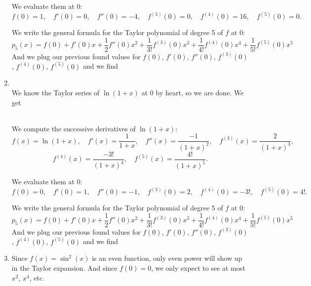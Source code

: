 \documentclass[pdftex,11pt]{article}
\begin{document}
\begin{enumerate}
We evaluate them at $0$:
$$ 
f(0) = 1,
\quad
f'(0) = 0,
\quad
f''(0) = -4,
\quad
f^{(3)}(0) = 0,
\quad
f^{(4)}(0) = 16,
\quad
f^{(5)}(0) = 0.
$$

We write the general formula for the Taylor polynomial of degree 5 of $f$ at $0$:
$$ 
p_5(x) = f(0) + f'(0) x + \frac{1}{2} f''(0) x^2 + \frac{1}{3!} f^{(3)}(0) x^3 + \frac{1}{4!} f^{(4)}(0) x^4 + \frac{1}{5!} f^{(5)}(0) x^5
$$
And we plug our previous found values for $f(0)$, $f'(0)$,
$f''(0)$,
$f^{(3)}(0)$,
$f^{(4)}(0)$,
$f^{(5)}(0)$
and we find
\begin{center}
\end{center}


\item
{}\\

We know the Taylor series of $\ln(1+x)$ at $0$ by heart, so we are done.
We get
\begin{center}
\end{center}


\\

We compute the successive derivatives of $\ln(1+x)$:
$$ 
f(x) = \ln(1+x),
\quad
f'(x) = \frac{1}{1+x},
\quad
f''(x) = \frac{-1}{(1+x)^2},
\quad
f^{(3)}(x) = \frac{2}{(1+x)^3},
$$$$
f^{(4)}(x) = \frac{-3!}{(1+x)^4},
\quad
f^{(5)}(x) = \frac{4!}{(1+x)^5}.
$$

We evaluate them at $0$:
$$ 
f(0) = 0,
\quad
f'(0) = 1,
\quad
f''(0) = -1,
\quad
f^{(3)}(0) = 2,
\quad
f^{(4)}(0) = -3!,
\quad
f^{(5)}(0) = 4!.
$$

We write the general formula for the Taylor polynomial of degree 5 of $f$ at $0$:
$$ 
p_5(x) = f(0) + f'(0) x + \frac{1}{2} f''(0) x^2 + \frac{1}{3!} f^{(3)}(0) x^3 + \frac{1}{4!} f^{(4)}(0) x^4 + \frac{1}{5!} f^{(5)}(0) x^5
$$
And we plug our previous found values for $f(0)$, $f'(0)$,
$f''(0)$,
$f^{(3)}(0)$,
$f^{(4)}(0)$,
$f^{(5)}(0)$
and we find
\begin{center}
\end{center}


\item
Since $f(x) = \sin^2(x)$ is an even function, only even power will show up in
the Taylor expansion. And since $f(0)=0$, we only expect to see at most $x^2$,
$x^4$, etc.\\


\end{enumerate}
\end{document}
